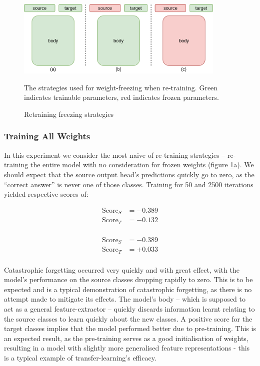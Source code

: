 \documentclass{report}
\newcommand{\SCORE}[2]{
	\begin{align*}
	\text{Score}_S &= #1 \\
	\text{Score}_T &= #2 \\
	\end{align*}
}
\begin{document}
	\begin{figure}[h]
		\centering
		\includegraphics[width=10cm]{freezing}
		\caption{Retraining freezing strategies}
		The strategies used for weight-freezing when re-training. Green indicates trainable parameters, red indicates frozen parameters.
		\label{fig:freezing:1}
	\end{figure}
	\subsubsection{Training All Weights}
	In this experiment we consider the most naive of re-training strategies -- re-training the entire model with no consideration for frozen weights (figure \ref{fig:freezing:1}a). We should expect that the source output head's predictions quickly go to zero, as the ``correct answer'' is never one of those classes. Training for 50 and 2500 iterations yielded respective scores of:
	\SCORE{-0.389}{-0.132}
	\SCORE{-0.389}{+0.033}
	Catastrophic forgetting occurred very quickly and with great effect, with the model's performance on the source classes dropping rapidly to zero. This is to be expected and is a typical demonstration of catastrophic forgetting, as there is no attempt made to mitigate its effects. The model's body -- which is supposed to act as a general feature-extractor -- quickly discards information learnt relating to the source classes to learn quickly about the new classes. 
	A positive score for the target classes implies that the model performed better due to pre-training. This is an expected result, as the pre-training serves as a good initialisation of weights, resulting in a model with slightly more generalised feature representations - this is a typical example of transfer-learning's efficacy. \par
	
\end{document}
